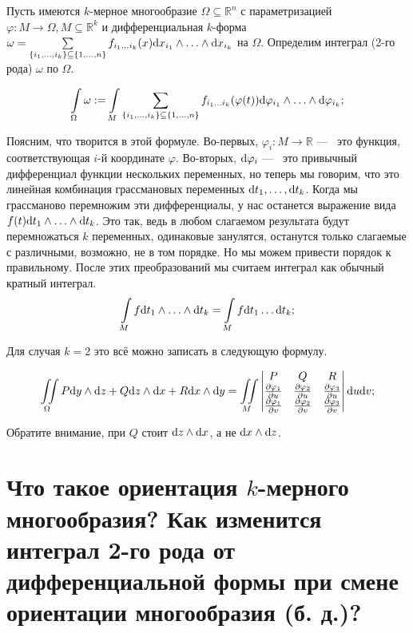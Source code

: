 \documentclass{article}
\begin{document}
	Пусть имеются $k$-мерное многообразие $\Omega \subseteq \mathbb{R}^n$ с параметризацией $\varphi: M \to \Omega, M \subseteq \mathbb{R}^k$ и дифференциальная $k$-форма $\omega = \sum\limits_{\{i_1, \ldots, i_k\} \subseteq \{1, \ldots, n\}} f_{i_1 \ldots i_k}(x)\mathrm{d} x_{i_1} \land \ldots \land \mathrm{d} x_{i_k}$ на $\Omega$. Определим интеграл (2-го рода) $\omega$ по $\Omega$.

	\[ \int\limits_\Omega \omega := \int\limits_M \sum_{\{i_1, \ldots, i_k\} \subseteq \{1, \ldots, n\}} f_{i_1 \ldots i_k} (\varphi(t)) \mathrm{d} \varphi_{i_1} \land \ldots \land \mathrm{d} \varphi_{i_k}; \]

	Поясним, что творится в этой формуле. Во-первых, $\varphi_i : M \to \mathbb{R}$ ---~ это функция, соответствующая $i$-й координате $\varphi$. Во-вторых, $\mathrm{d} \varphi_i$ ---~ это привычный дифференциал функции нескольких переменных, но теперь мы говорим, что это линейная комбинация грассмановых переменных $\mathrm{d} t_1, \ldots, \mathrm{d} t_k$. Когда мы грассманово перемножим эти дифференциалы, у нас останется выражение вида $f(t) \mathrm{d} t_1 \land \ldots  \land \mathrm{d} t_k$. Это так, ведь в любом слагаемом результата будут перемножаться $k$ переменных, одинаковые занулятся, останутся только слагаемые с различными, возможно, не в том порядке. Но мы можем привести порядок к правильному. После этих преобразований мы считаем интеграл как обычный кратный интеграл.
\[\int\limits_M f \mathrm{d} t_1 \land \ldots \land \mathrm{d} t_k = \int\limits_M f \mathrm{d} t_1 \ldots \mathrm{d} t_k;  \]  

	Для случая $k = 2$ это всё можно записать в следующую формулу.

	\[\iint\limits_\Omega P\mathrm{d} y \land \mathrm{d} z + Q \mathrm{d} z \land \mathrm{d} x + R \mathrm{d} x \land \mathrm{d} y = \iint\limits_M \begin{vmatrix} P & Q & R \\ \frac{\partial \varphi_1}{\partial u} & \frac{\partial \varphi_2}{\partial u} & \frac{\partial \varphi_3}{\partial u} \\ \frac{\partial \varphi_1}{\partial v} & \frac{\partial \varphi_2}{\partial v} & \frac{\partial \varphi_3}{\partial v} \end{vmatrix} \mathrm{d} u \mathrm{d} v;\]

	Обратите внимание, при $Q$ стоит $\mathrm{d} z \land \mathrm{d} x$, а не $\mathrm{d} x \land \mathrm{d} z$. 

	\section{Что такое ориентация $k$-мерного многообразия? Как изменится интеграл 2-го рода от дифференциальной формы при смене ориентации многообразия (б. д.)?}
\end{document}
